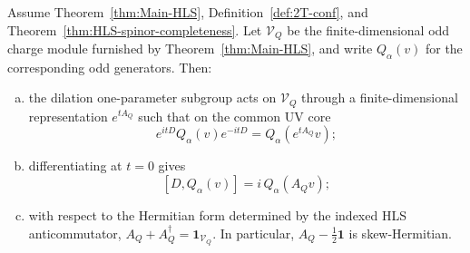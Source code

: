 \begin{lemma}
\label{lem:4a-D-stability}
Assume Theorem~\ref{thm:Main-HLS},
Definition~\ref{def:2T-conf}, and
Theorem~\ref{thm:HLS-spinor-completeness}. Let \(\mathcal V_Q\) be the
finite-dimensional odd charge module furnished by
Theorem~\ref{thm:Main-HLS}, and write \(Q_\alpha(v)\) for the
corresponding odd generators. Then:
\begin{enumerate}[(a)]
  \item the dilation one-parameter subgroup acts on \(\mathcal V_Q\) through a
        finite-dimensional representation \(e^{tA_Q}\) such that on the common UV
        core
        \[
          e^{itD}Q_\alpha(v)e^{-itD}=Q_\alpha(e^{tA_Q}v);
        \]
  \item differentiating at \(t=0\) gives
        \[
          [D,Q_\alpha(v)] = i\,Q_\alpha(A_Qv);
        \]
  \item with respect to the Hermitian form determined by the indexed HLS
        anticommutator, \(A_Q+A_Q^\dagger=\mathbf 1_{\mathcal V_Q}\). In
        particular, \(A_Q-\tfrac12\mathbf 1\) is skew-Hermitian.
\end{enumerate}
\end{lemma}

